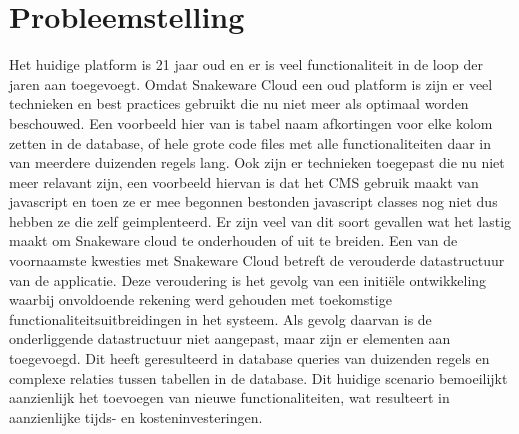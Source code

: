 \section{Probleemstelling}
Het huidige platform is 21 jaar oud en er is veel functionaliteit in de loop der jaren aan toegevoegt.
Omdat Snakeware Cloud een oud platform is zijn er veel technieken en best practices gebruikt die nu niet meer als optimaal worden beschouwed.
Een voorbeeld hier van is tabel naam afkortingen voor elke kolom zetten in de database, of hele grote code files met alle functionaliteiten daar in van meerdere duizenden regels lang. 
Ook zijn er technieken toegepast die nu niet meer relavant zijn, een voorbeeld hiervan is dat het \gls{CMS} gebruik maakt van javascript en toen ze er mee begonnen bestonden javascript classes nog niet dus hebben ze die zelf geimplenteerd.
Er zijn veel van dit soort gevallen wat het lastig maakt om Snakeware cloud te onderhouden of uit te breiden.
\whitespace
Een van de voornaamste kwesties met Snakeware Cloud betreft de verouderde datastructuur van de applicatie.
Deze veroudering is het gevolg van een initiële ontwikkeling waarbij onvoldoende rekening werd gehouden met toekomstige functionaliteitsuitbreidingen in het systeem.
Als gevolg daarvan is de onderliggende datastructuur niet aangepast, maar zijn er elementen aan toegevoegd.
Dit heeft geresulteerd in database queries van duizenden regels en complexe relaties tussen tabellen in de database.
Dit huidige scenario bemoeilijkt aanzienlijk het toevoegen van nieuwe functionaliteiten, wat resulteert in aanzienlijke tijds- en kosteninvesteringen.
